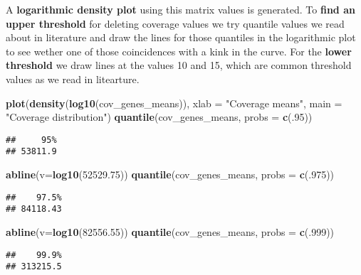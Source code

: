 \documentclass[]{article}
\newenvironment{Shaded}{\begin{snugshade}}{\end{snugshade}}
\newcommand{\KeywordTok}[1]{\textcolor[rgb]{0.13,0.29,0.53}{\textbf{#1}}}
\newcommand{\DataTypeTok}[1]{\textcolor[rgb]{0.13,0.29,0.53}{#1}}
\newcommand{\DecValTok}[1]{\textcolor[rgb]{0.00,0.00,0.81}{#1}}
\newcommand{\FloatTok}[1]{\textcolor[rgb]{0.00,0.00,0.81}{#1}}
\newcommand{\StringTok}[1]{\textcolor[rgb]{0.31,0.60,0.02}{#1}}
\newcommand{\NormalTok}[1]{#1}
\begin{document}
A \textbf{logarithmic density plot} using this matrix values is
generated. To \textbf{find an upper threshold} for deleting coverage
values we try quantile values we read about in literature and draw the
lines for those quantiles in the logarithmic plot to see wether one of
those coincidences with a kink in the curve. For the \textbf{lower
threshold} we draw lines at the values 10 and 15, which are common
threshold values as we read in litearture.

\begin{Shaded}
\begin{Highlighting}[]
\KeywordTok{plot}\NormalTok{(}\KeywordTok{density}\NormalTok{(}\KeywordTok{log10}\NormalTok{(cov_genes_means)), }\DataTypeTok{xlab =} \StringTok{"Coverage means"}\NormalTok{, }\DataTypeTok{main =} \StringTok{"Coverage distribution"}\NormalTok{)}
\KeywordTok{quantile}\NormalTok{(cov_genes_means, }\DataTypeTok{probs =} \KeywordTok{c}\NormalTok{(.}\DecValTok{95}\NormalTok{))}
\end{Highlighting}
\end{Shaded}

\begin{verbatim}
##     95% 
## 53811.9
\end{verbatim}

\begin{Shaded}
\begin{Highlighting}[]
\KeywordTok{abline}\NormalTok{(}\DataTypeTok{v=}\KeywordTok{log10}\NormalTok{(}\FloatTok{52529.75}\NormalTok{))}
\KeywordTok{quantile}\NormalTok{(cov_genes_means, }\DataTypeTok{probs =} \KeywordTok{c}\NormalTok{(.}\DecValTok{975}\NormalTok{))}
\end{Highlighting}
\end{Shaded}

\begin{verbatim}
##    97.5% 
## 84118.43
\end{verbatim}

\begin{Shaded}
\begin{Highlighting}[]
\KeywordTok{abline}\NormalTok{(}\DataTypeTok{v=}\KeywordTok{log10}\NormalTok{(}\FloatTok{82556.55}\NormalTok{))}
\KeywordTok{quantile}\NormalTok{(cov_genes_means, }\DataTypeTok{probs =} \KeywordTok{c}\NormalTok{(.}\DecValTok{999}\NormalTok{))}
\end{Highlighting}
\end{Shaded}

\begin{verbatim}
##    99.9% 
## 313215.5
\end{verbatim}
\end{document}
